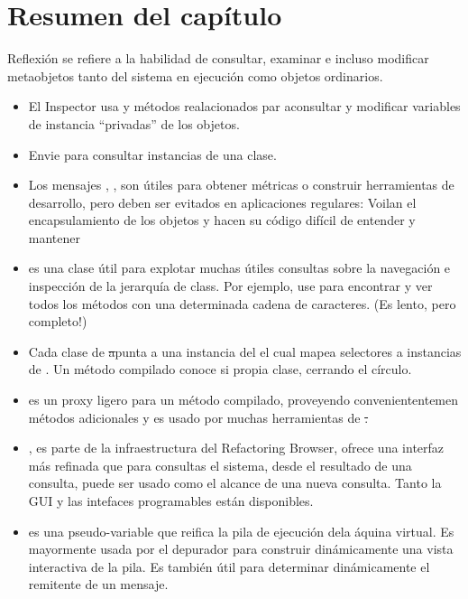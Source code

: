 \documentclass[a4paper,10pt,twoside]{book}
\begin{document}

\section{Resumen del cap\'itulo}

Reflexi\'on se refiere a la habilidad de consultar, examinar e incluso modificar metaobjetos tanto del sistema en ejecuci\'on como objetos ordinarios.

\begin{itemize}
\item El Inspector usa  y m\'etodos realacionados par aconsultar y modificar variables de instancia ``privadas'' de los objetos.
\item Envie  para consultar instancias de una clase.
\item Los mensajes , ,  \etc  son \'utiles para obtener m\'etricas o construir herramientas de desarrollo, pero deben ser evitados en aplicaciones regulares: Voilan el encapsulamiento de los objetos y hacen su c\'odigo dif\'icil de entender y mantener
\item {} es una clase \'util para explotar muchas \'utiles consultas sobre la navegaci\'on e inspecci\'on de la jerarqu\'ia de \ct class. Por ejemplo, use  para encontrar y ver todos los m\'etodos con una determinada cadena de caracteres. (Es lento, pero completo!)
\item Cada clase de \st apunta a una instancia del  el cual mapea selectores a instancias de . Un m\'etodo compilado conoce si propia clase, cerrando el c\'irculo.
\item {} es un proxy ligero para un m\'etodo compilado, proveyendo conveniententemen m\'etodos adicionales y es usado por muchas herramientas de \st .
\item {}, es parte de la infraestructura del Refactoring Browser, ofrece una interfaz m\'as refinada que  para consultas el sistema, desde el resultado de una consulta, puede ser usado como el alcance de una nueva consulta. Tanto la GUI y las intefaces programables est\'an disponibles.
\item {} es una pseudo-variable que reifica la pila de ejecuci\'on dela \'aquina virtual. Es mayormente usada por el depurador para construir din\'amicamente una vista interactiva de la pila. Es tambi\'en \'util para determinar din\'amicamente el remitente de un mensaje.

\end{itemize}
\end{document}

